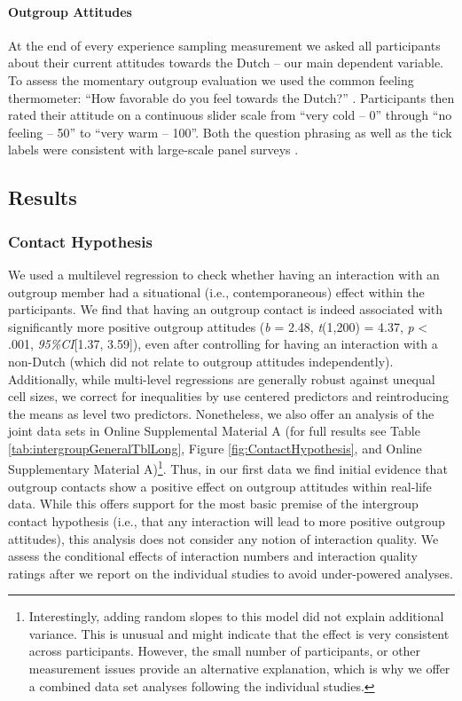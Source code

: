 \paragraph{Outgroup Attitudes}

At the end of every experience sampling measurement we asked all
participants about their current attitudes towards the Dutch -- our main
dependent variable. To assess the momentary outgroup evaluation we used
the common feeling thermometer: ``How favorable do you feel towards the
Dutch?'' \citep[][]{Lavrakas2008}. Participants then rated their
attitude on a continuous slider scale from ``very cold -- 0'' through
``no feeling -- 50'' to ``very warm -- 100''. Both the question phrasing
as well as the tick labels were consistent with large-scale panel
surveys \citep[e.g.,][]{DeBell2010}.

\subsection{Results}

\subsubsection{Contact Hypothesis}

We used a multilevel regression to check whether having an interaction
with an outgroup member had a situational (i.e., contemporaneous) effect
within the participants. We find that having an outgroup contact is
indeed associated with significantly more positive outgroup attitudes
(\textit{b} = 2.48, \textit{t}(1,200) = 4.37, \textit{p} \textless{}
.001, \textit{95\%CI}{[}1.37, 3.59{]}), even after controlling for
having an interaction with a non-Dutch (which did not relate to outgroup
attitudes independently). Additionally, while multi-level regressions
are generally robust against unequal cell sizes, we correct for
inequalities by use centered predictors and reintroducing the means as
level two predictors. Nonetheless, we also offer an analysis of the
joint data sets in Online Supplemental Material A (for full results see
Table \ref{tab:intergroupGeneralTblLong}, Figure
\ref{fig:ContactHypothesis}, and Online Supplementary Material
A)\footnote{Interestingly, adding random slopes to this model did not explain additional variance. This is unusual and might indicate that the effect is very consistent across participants. However, the small number of participants, or other measurement issues provide an alternative explanation, which is why we offer a combined data set analyses following the individual studies.}.
Thus, in our first data we find initial evidence that outgroup contacts
show a positive effect on outgroup attitudes within real-life data.
While this offers support for the most basic premise of the intergroup
contact hypothesis (i.e., that any interaction will lead to more
positive outgroup attitudes), this analysis does not consider any notion
of interaction quality. We assess the conditional effects of interaction
numbers and interaction quality ratings after we report on the
individual studies to avoid under-powered analyses.

